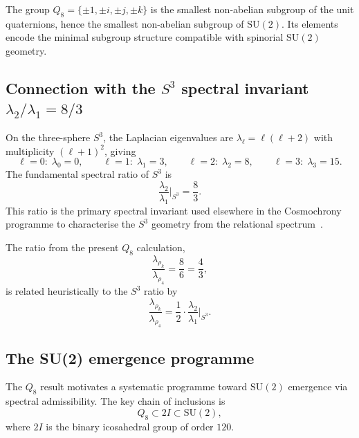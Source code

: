 \documentclass[11pt,a4paper]{article}
\begin{document}
    The group $Q_8 = \{\pm 1, \pm i, \pm j, \pm k\}$ is the smallest
    non-abelian subgroup of the unit quaternions, hence the smallest
    non-abelian subgroup of $\mathrm{SU}(2)$.
    Its elements encode the minimal subgroup structure compatible with spinorial
    $\mathrm{SU}(2)$ geometry.

  \subsection{Connection with the $S^3$ spectral invariant $\lambda_2/\lambda_1 = 8/3$}
    \label{sec:step4-S3}

    On the three-sphere $S^3$, the Laplacian eigenvalues are
    $\lambda_\ell = \ell(\ell + 2)$ with multiplicity $(\ell+1)^2$, giving
    \begin{equation}
      \ell = 0:\;\lambda_0 = 0,
      \qquad
      \ell = 1:\;\lambda_1 = 3,
      \qquad
      \ell = 2:\;\lambda_2 = 8,
      \qquad
      \ell = 3:\;\lambda_3 = 15.
    \end{equation}
    The fundamental spectral ratio of $S^3$ is
    \begin{equation}
      \frac{\lambda_2}{\lambda_1}\bigg|_{S^3} = \frac{8}{3}.
      \label{eq:S3-ratio}
    \end{equation}
    This ratio is the primary spectral invariant used elsewhere in the
    Cosmochrony programme to characterise the $S^3$ geometry from the
    relational spectrum~\cite{Spectral121}.

    The ratio from the present $Q_8$ calculation,
    \begin{equation}
      \frac{\lambda_{\rho_k}}{\lambda_{\rho_4}} = \frac{8}{6} = \frac{4}{3},
    \end{equation}
    is related heuristically to the $S^3$ ratio by
    \begin{equation}
      \frac{\lambda_{\rho_k}}{\lambda_{\rho_4}}
      = \frac{1}{2}\cdot\frac{\lambda_2}{\lambda_1}\bigg|_{S^3}.
      \label{eq:ratio-relation}
    \end{equation}

  \subsection{The SU(2) emergence programme}
    \label{sec:step4-programme}

    The $Q_8$ result motivates a systematic programme toward $\mathrm{SU}(2)$
    emergence via spectral admissibility.
    The key chain of inclusions is
    \begin{equation}
      Q_8 \subset 2I \subset \mathrm{SU}(2),
      \label{eq:inclusion-chain}
    \end{equation}
    where $2I$ is the binary icosahedral group of order $120$.
\end{document}
